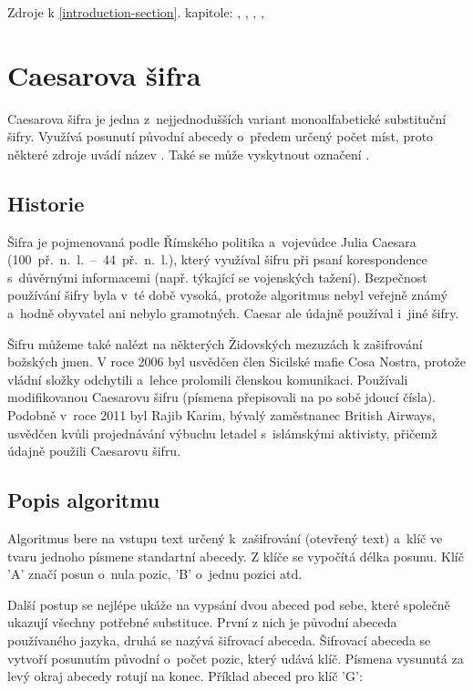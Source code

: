 \documentclass[glossaries, index]{kidiplom}
\begin{document}
\vspace*{\fill}

\noindent
Zdroje k \ref{introduction-section}. kapitole: \cite{singh2009}, \cite{adams2003}, \cite{cryptographywiki}, \cite{cryptographywiki-en}, \cite{frequencyanalysiswiki}

\newpage


\section{Caesarova šifra}
\label{caesar-section}
Caesarova šifra je jedna z~nejjednodušších variant monoalfabetické substituční šifry. Využívá posunutí původní abecedy o~předem určený počet míst, proto některé zdroje uvádí název . Také se může vyskytnout označení .

\subsection{Historie}
\label{caesar-history}
Šifra je pojmenovaná podle Římského politika a~vojevůdce Julia Caesara (100~př.~n.~l.~--~44~př.~n.~l.), který využíval šifru při psaní korespondence s~důvěrnými informacemi (např. týkající se vojenských tažení). Bezpečnost používání šifry byla v~té době vysoká, protože algoritmus nebyl veřejně známý a~hodně obyvatel ani nebylo gramotných. Caesar ale údajně používal i~jiné šifry.

Šifru můžeme také nalézt na některých Židovských mezuzách k zašifrování božských jmen. 
V roce 2006 byl usvědčen člen Sicilské mafie Cosa Nostra, protože vládní složky odchytili a~lehce prolomili členskou komunikaci. Používali modifikovanou Caesarovu šifru (písmena přepisovali na po sobě jdoucí čísla). Podobně v~roce 2011 byl Rajib Karim, bývalý zaměstnanec British Airways, usvědčen kvůli projednávání výbuchu letadel s~islámskými aktivisty, přičemž údajně použili Caesarovu šifru.

\subsection{Popis algoritmu}
\label{caesar-popis-algoritmu}
Algoritmus bere na vstupu text určený k~zašifrování (otevřený text) a~klíč ve tvaru jednoho písmene standartní abecedy. Z klíče se vypočítá délka posunu. Klíč 'A' značí posun o~nula pozic, 'B' o~jednu pozici atd.

Další postup se nejlépe ukáže na vypsání dvou abeced pod sebe, které společně ukazují všechny potřebné substituce. První z nich je původní abeceda používaného jazyka, druhá se nazývá šifrovací abeceda. Šifrovací abeceda se vytvoří posunutím původní o~počet pozic, který udává klíč. Písmena vysunutá za levý okraj abecedy rotují na konec. Příklad abeced pro klíč 'G':\\
\end{document}
